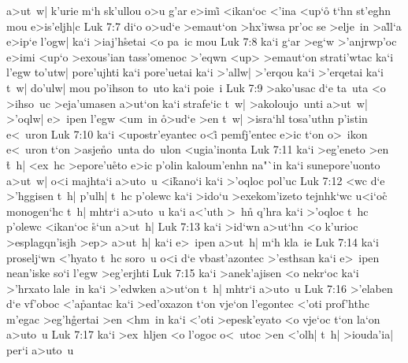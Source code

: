 a>ut~w|
k'urie
m`h
sk'ullou
o>u
g'ar
e>imi\r{}
<ikan`oc
<'ina
<up`o\r{}
t`hn
st'eghn
mou
e>is'eljh|c\bibvsend
\vs Luk 7:7
di`o
o>ud`e
>emaut`on
>hx'iwsa
pr'oc
se
>elje~in
>a\r{l}l`a
e>ip`e
l'ogw|
ka`i
>iaj'h\r{s}etai
<o
pa~ic
mou\bibvsend
\vs Luk 7:8
ka`i
g`ar
>eg`w
>'anjrwp'oc
e>imi
<up`o
>exous'ian
tass'omenoc
>'eqwn
<up>
>emaut`on
strati'wtac
ka`i
l'egw
to'utw|
pore'ujhti
ka`i
pore'uetai
ka`i
>'allw|
>'erqou
ka`i
>'erqetai
ka`i
t~w|
do'ulw|
mou
po'ihson
to~uto
ka`i
poie~i\bibvsend
\vs Luk 7:9
>ako'usac
d`e
ta~uta
<o
>ihso~uc
>eja'umasen
a>ut`on
ka`i
strafe`ic
t~w|
>akoloujo~unti
a>ut~w|
>'oqlw|
e>~ipen
l'egw
<um~in
\r{o}>ud`e
>en
t~w|
>isra`hl
tosa'uthn
p'istin
e<~uron\bibvsend
\vs Luk 7:10
ka`i
<upostr'eyantec
o<i\r{}
pemfj'entec
e>ic
t`on
o>~ikon
e<~uron
t`on
>asje\r{n}o~unta
do~ulon
<ugia'inonta\bibvsend
\vs Luk 7:11
ka`i
>eg'eneto
>en
\r{t}~h|
<ex~hc
>epore'u\r{e}to
e>ic
p'olin
kaloum'enhn
na"`in
ka`i
sunepore'uonto
a>ut~w|
o<i
majhta`i
a>uto~u
<i\r{k}ano`i
ka`i
>'oqloc
pol'uc\bibvsend
\vs Luk 7:12
<wc
d`e
>'hggisen
t~h|
p'ulh|
t~hc
p'olewc
ka`i
>ido`u
>exekom'izeto
tejnhk`wc
u<i`oc\r{}
monogen`hc
t~h|
mhtr`i
a>uto~u
ka`i
a<'uth
>~h\r{n}
q'hra
ka`i
>'oqloc
t~hc
p'olewc
<ikan`oc
\r{s}`un
a>ut~h|\bibvsend
\vs Luk 7:13
ka`i
>id`wn
a>ut`hn
<o
k'urioc
>esplagqn'isjh
>ep>
a>ut~h|
ka`i
e>~ipen
a>ut~h|
m`h
kla~ie\bibvsend
\vs Luk 7:14
ka`i
proselj`wn
<'hyato
t~hc
soro~u
o<i
d`e
vbast'azontec
>'esthsan
ka`i
e>~ipen
nean'iske
so`i
l'egw
>eg'erjhti\bibvsend
\vs Luk 7:15
ka`i
>anek'ajisen
<o
nekr`oc
ka`i
>'hrxato
lale~in
ka`i
>'edwken
a>ut`on
t~h|
mhtr`i
a>uto~u\bibvsend
\vs Luk 7:16
>'elaben
d`e
vf'oboc
<'a\r{p}antac
ka`i
>ed'oxazon
t`on
vje`on
l'egontec
<'oti
prof'hthc
m'egac
>eg'h\r{g}ertai
>en
<hm~in
ka`i
<'oti
>epesk'eyato
<o
vje`oc
t`on
la`on
a>uto~u\bibvsend
\vs Luk 7:17
ka`i
>ex~hljen
<o
l'ogoc
o<~utoc
>en
<'olh|
t~h|
>iouda'ia|
per`i
a>uto~u

